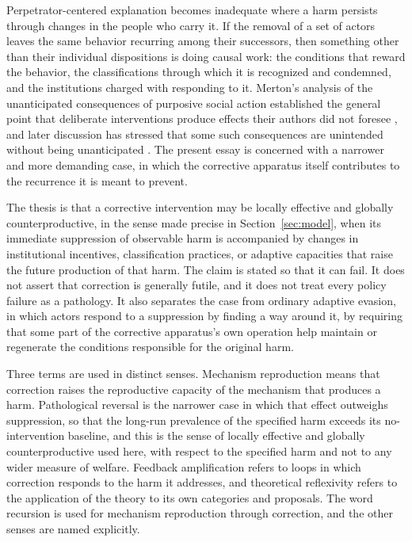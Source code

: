 \documentclass[12pt]{article}
\theoremstyle{remark}
\begin{document}
Perpetrator-centered explanation becomes inadequate where a harm persists through changes in the people who carry it. If the removal of a set of actors leaves the same behavior recurring among their successors, then something other than their individual dispositions is doing causal work: the conditions that reward the behavior, the classifications through which it is recognized and condemned, and the institutions charged with responding to it. Merton's analysis of the unanticipated consequences of purposive social action established the general point that deliberate interventions produce effects their authors did not foresee \cite{merton1936}, and later discussion has stressed that some such consequences are unintended without being unanticipated \cite{dezwart2015}. The present essay is concerned with a narrower and more demanding case, in which the corrective apparatus itself contributes to the recurrence it is meant to prevent.

The thesis is that a corrective intervention may be locally effective and globally counterproductive, in the sense made precise in Section~\ref{sec:model}, when its immediate suppression of observable harm is accompanied by changes in institutional incentives, classification practices, or adaptive capacities that raise the future production of that harm. The claim is stated so that it can fail. It does not assert that correction is generally futile, and it does not treat every policy failure as a pathology. It also separates the case from ordinary adaptive evasion, in which actors respond to a suppression by finding a way around it, by requiring that some part of the corrective apparatus's own operation help maintain or regenerate the conditions responsible for the original harm.

Three terms are used in distinct senses. Mechanism reproduction means that correction raises the reproductive capacity of the mechanism that produces a harm. Pathological reversal is the narrower case in which that effect outweighs suppression, so that the long-run prevalence of the specified harm exceeds its no-intervention baseline, and this is the sense of locally effective and globally counterproductive used here, with respect to the specified harm and not to any wider measure of welfare. Feedback amplification refers to loops in which correction responds to the harm it addresses, and theoretical reflexivity refers to the application of the theory to its own categories and proposals. The word recursion is used for mechanism reproduction through correction, and the other senses are named explicitly.
\end{document}
